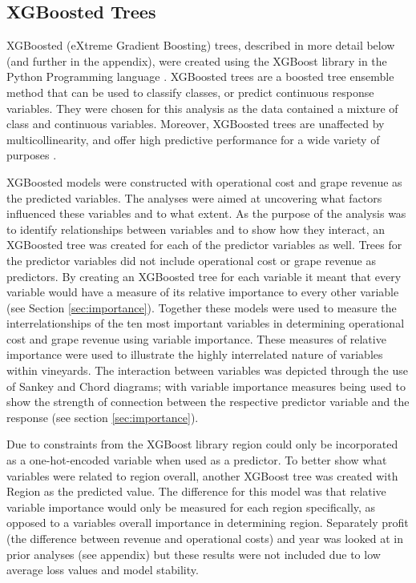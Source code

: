 \documentclass[review,12pt,authoryear]{elsarticle}
\begin{document}
\begin{linenumbers}
\subsection{XGBoosted Trees}
XGBoosted (eXtreme Gradient Boosting) trees, described in more detail below (and further in the appendix), were created using the XGBoost library \citep{chenXGBoostScalableTree2016} in the Python Programming language \citep{g.vanrossumPythonTutorialTechnical1995}. XGBoosted trees are a boosted tree ensemble method that can be used to classify classes, or predict continuous response variables. They were chosen for this analysis as the data contained a mixture of class and continuous variables. Moreover, XGBoosted trees are unaffected by multicollinearity, and offer high predictive performance for a wide variety of purposes \citep{chenXGBoostScalableTree2016}.
\par
XGBoosted models were constructed with operational cost and grape revenue as the predicted variables. The analyses were aimed at uncovering what factors influenced these variables and to what extent. As the purpose of the analysis was to identify relationships between variables and to show how they interact, an XGBoosted tree was created for each of the predictor variables as well. Trees for the predictor variables did not include operational cost or grape revenue as predictors. By creating an XGBoosted tree for each variable it meant that every variable would have a measure of its relative importance to every other variable (see Section \ref{sec:importance}). Together these models were used to measure the interrelationships of the ten most important variables in determining operational cost and grape revenue using variable importance. These measures of relative importance were used to illustrate the highly interrelated nature of variables within vineyards. The interaction between variables was depicted through the use of Sankey and Chord diagrams; with variable importance measures being used to show the strength of connection between the respective predictor variable and the response (see section \ref{sec:importance}).
\par
Due to constraints from the XGBoost library region could only be incorporated as a one-hot-encoded variable when used as a predictor. To better show what variables were related to region overall, another XGBoost tree was created with Region as the predicted value. The difference for this model was that relative variable importance would only be measured for each region specifically, as opposed to a variables overall importance in determining region. Separately profit (the difference between revenue and operational costs) and year was looked at in prior analyses (see appendix) but these results were not included due to low average loss values and model stability. 

\end{linenumbers}
\end{document}
